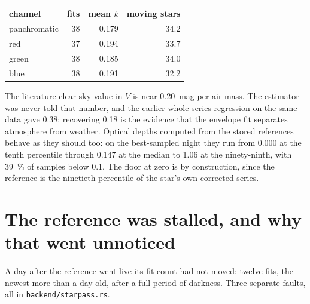 \documentclass[11pt,a4paper]{article}
\begin{document}
\begin{center}\small
\begin{tabular}{lrrr}
\toprule
channel & fits & mean $k$ & moving stars \\
\midrule
panchromatic & 38 & 0.179 & 34.2 \\
red & 37 & 0.194 & 33.7 \\
green & 38 & 0.185 & 34.0 \\
blue & 38 & 0.191 & 32.2 \\
\bottomrule
\end{tabular}
\end{center}

\noindent The literature clear-sky value in $V$ is near \SI{0.20}{mag} per air
mass. The estimator was never told that number, and the earlier whole-series
regression on the same data gave \num{0.38}; recovering \num{0.18} is the
evidence that the envelope fit separates atmosphere from weather. Optical
depths computed from the stored references behave as they should too: on the
best-sampled night they run from \num{0.000} at the tenth percentile through
\num{0.147} at the median to \num{1.06} at the ninety-ninth, with
\SI{39}{\percent} of samples below \num{0.1}. The floor at zero is by
construction, since the reference is the ninetieth percentile of the star's own
corrected series.

\section{The reference was stalled, and why that went unnoticed}
\label{sec:stall}

A day after the reference went live its fit count had not moved: twelve fits,
the newest more than a day old, after a full period of darkness. Three separate
faults, all in \texttt{backend/starpass.rs}.
\end{document}
